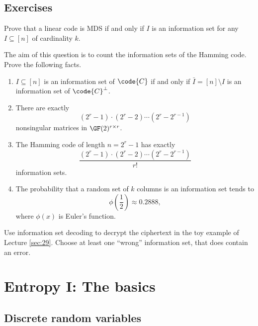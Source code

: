 \documentclass[a4paper, 11pt, openany]{book}
\begin{document}
\subsection{Exercises}



\begin{exercise}
Prove that a linear code is MDS if and only if $I$ is an information set for any $I \subseteq [n]$ of cardinality $k$.
\end{exercise}



\begin{exercise}
The aim of this question is to count the information sets of the Hamming code. Prove the following facts.
\begin{enumerate}
	\item $I \subseteq [n]$ is an information set of $\code{C}$ if and only if $\bar{I} = [n] \setminus I$ is an information set of $\code{C}^\perp$.

	\item There are exactly
	\[
		(2^r - 1) \cdot (2^r - 2) \cdots (2^r - 2^{r-1})
	\]
	nonsingular matrices in $\GF(2)^{r \times r}$.

	\item The Hamming code of length $n = 2^r - 1$ has exactly
	\[
		\frac{ (2^r - 1) \cdot (2^r - 2) \cdots (2^r - 2^{r-1}) }{ r! }
	\]
	information sets.

	\item The probability that a random set of $k$ columns is an information set tends to
	\[
		\phi\left( \frac{1}{2} \right) \approx 0.2888,
	\]
	where $\phi(x)$ is Euler's function.
\end{enumerate}
\end{exercise}


\begin{exercise}
Use information set decoding to decrypt the ciphertext in the toy example of Lecture \ref{sec:29}. Choose at least one ``wrong'' information set, that does contain an error.
\end{exercise}


\section{Entropy I: The basics}
\label{sec:31}



\subsection{Discrete random variables}
\end{document}
